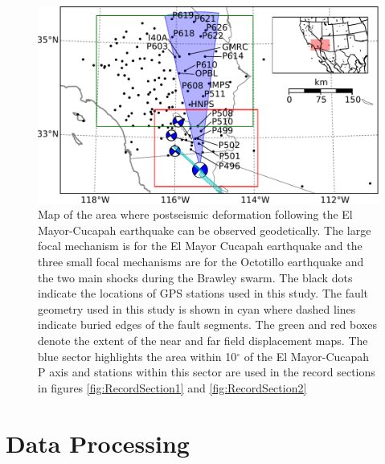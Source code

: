 \documentclass[1p]{elsarticle}
\begin{document}
\begin{figure}
\includegraphics[scale=0.8]{Figures/context_map} 
\caption{Map of the area where postseismic deformation following the El Mayor-Cucapah earthquake can be observed geodetically. The large focal mechanism is for the El Mayor Cucapah earthquake and the three small focal mechanisms are for the Octotillo earthquake and the two main shocks during the Brawley swarm. The black dots indicate the locations of GPS stations used in this study.  The fault geometry used in this study is shown in cyan where dashed lines indicate buried edges of the fault segments.  The green and red boxes denote the extent of the near and far field displacement maps.  The blue sector highlights the area within 10$^\circ$ of the El Mayor-Cucapah P axis and stations within this sector are used in the record sections in figures \ref{fig:RecordSection1} and \ref{fig:RecordSection2}}       
\label{fig:ContextMap}
\end{figure}

\section{Data Processing}\label{sec:Data}
\end{document}
